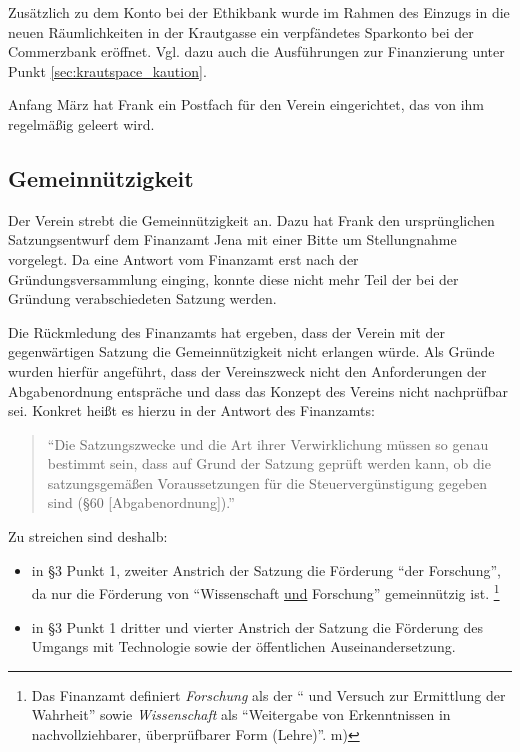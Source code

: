 \documentclass[10pt,DIV16]{scrartcl}
\begin{document}
Zusätzlich zu dem Konto bei der Ethikbank wurde im Rahmen des Einzugs in die
neuen Räumlichkeiten in der Krautgasse ein verpfändetes Sparkonto bei der
Commerzbank eröffnet. Vgl. dazu auch die Ausführungen zur Finanzierung unter
Punkt \ref{sec:krautspace_kaution}.

Anfang März hat Frank ein Postfach für den Verein eingerichtet, das
von ihm regelmäßig geleert wird.

\subsection{Gemeinnützigkeit}

Der Verein strebt die Gemeinnützigkeit an.  Dazu hat Frank den
ursprünglichen Satzungsentwurf dem Finanzamt Jena mit einer Bitte um
Stellungnahme vorgelegt. Da eine Antwort vom Finanzamt erst nach der
Gründungsversammlung einging, konnte diese nicht mehr Teil der bei
der Gründung verabschiedeten Satzung werden.

Die Rückmledung des Finanzamts hat ergeben, dass der Verein mit der
gegenwärtigen Satzung die Gemeinnützigkeit nicht erlangen würde. Als
Gründe wurden hierfür angeführt, dass der Vereinszweck nicht den
Anforderungen der Abgabenordnung entspräche und dass das Konzept des
Vereins nicht nachprüfbar sei. Konkret heißt es hierzu in der
Antwort des Finanzamts:

\begin{quote}
	"`Die Satzungszwecke und die Art ihrer Verwirklichung müssen so genau
	bestimmt sein, dass auf Grund der Satzung geprüft werden kann, ob die
	satzungsgemäßen Voraussetzungen für die Steuervergünstigung gegeben sind
	(§60 [Abgabenordnung])."'
\end{quote}

Zu streichen sind deshalb:

\begin{itemize}
	\item
		in §3 Punkt 1, zweiter Anstrich der Satzung die Förderung "`der
		Forschung"', da nur die Förderung von "`Wissenschaft \underline{und}
		Forschung"' gemeinnützig ist.
		\footnote{
			Das Finanzamt definiert \emph{Forschung} als der
			"`\underline{} und
			\underline{} Versuch zur Ermittlung der
			Wahrheit"' sowie \emph{Wissenschaft} als "`Weitergabe von
			Erkenntnissen in nachvollziehbarer, überprüfbarer Form (Lehre)"'.
			\quad m)
		}
	\item
		in §3 Punkt 1 dritter und vierter Anstrich der Satzung die Förderung
		des Umgangs mit Technologie sowie der öffentlichen Auseinandersetzung.
\end{itemize}
\end{document}
